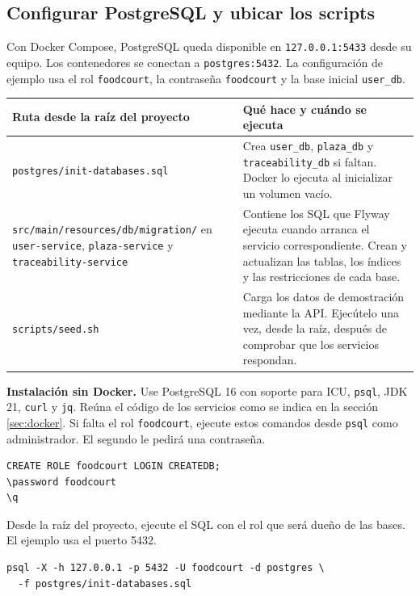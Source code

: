 \documentclass[11pt,a4paper]{article}
\newcommand{\code}[1]{\nolinkurl{#1}}
\begin{document}
\clearpage
\subsection{Configurar PostgreSQL y ubicar los scripts}\label{sec:postgres}
Con Docker Compose, PostgreSQL queda disponible en \code{127.0.0.1:5433} desde su equipo. Los contenedores se conectan a \code{postgres:5432}. La configuración de ejemplo usa el rol \code{foodcourt}, la contraseña \code{foodcourt} y la base inicial \code{user_db}.

\begin{minipage}{\linewidth}
\begin{tabularx}{\linewidth}{@{}P{74mm}Y@{}}
\toprule
Ruta desde la raíz del proyecto & Qué hace y cuándo se ejecuta \\
\midrule
\code{postgres/init-databases.sql} &
Crea \code{user_db}, \code{plaza_db} y \code{traceability_db} si faltan. Docker lo ejecuta al inicializar un volumen vacío. \\
\code{src/main/resources/db/migration/} en \code{user-service}, \code{plaza-service} y \code{traceability-service} &
Contiene los SQL que Flyway ejecuta cuando arranca el servicio correspondiente. Crean y actualizan las tablas, los índices y las restricciones de cada base. \\
\code{scripts/seed.sh} &
Carga los datos de demostración mediante la API. Ejecútelo una vez, desde la raíz, después de comprobar que los servicios respondan. \\
\bottomrule
\end{tabularx}
\end{minipage}

\textbf{Instalación sin Docker.} Use PostgreSQL 16 con soporte para ICU, \code{psql}, JDK 21, \code{curl} y \code{jq}. Reúna el código de los servicios como se indica en la sección \ref{sec:docker}. Si falta el rol \code{foodcourt}, ejecute estos comandos desde \code{psql} como administrador. El segundo le pedirá una contraseña.
\begin{lstlisting}
CREATE ROLE foodcourt LOGIN CREATEDB;
\password foodcourt
\q
\end{lstlisting}

Desde la raíz del proyecto, ejecute el SQL con el rol que será dueño de las bases. El ejemplo usa el puerto 5432.
\begin{lstlisting}
psql -X -h 127.0.0.1 -p 5432 -U foodcourt -d postgres \
  -f postgres/init-databases.sql
\end{lstlisting}
\end{document}
